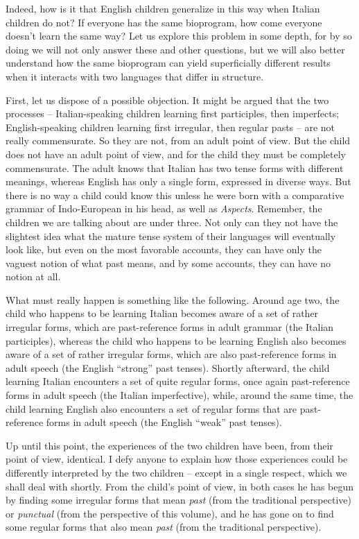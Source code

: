 Indeed, how is it that English children generalize in this way when Italian children do not? If everyone has the same bioprogram, how come everyone doesn't learn the same way? Let us explore this problem in some depth, for by so doing we will not only answer these and other questions, but we will also better understand how the same bioprogram can yield superficially different results when it interacts with two languages that differ in structure.

First, let us dispose of a possible objection. It might be argued that the two processes -- Italian-speaking children learning first parti\-ciples, then imperfects; English-speaking children learning first irregular, then regular pasts -- are not really commensurate. So they are not, from an adult point of view. But the child does not have an adult point of view, and for the child they must be completely commensurate. The adult knows that Italian has two tense forms with different meanings, whereas English has only a single form, expressed in diverse ways. But there is no way a child could know this unless he were born with a comparative grammar of Indo-European in his head, as well as \textit{Aspects}. Remember, the children we are talking about are under three. Not only can they not have the slightest idea what the mature tense system of their languages will eventually look like, but even on the most favorable accounts, they can have only the vaguest notion of what past means, and by some accounts, they can have no notion at all.


What must really happen is something like the following. Around age two, the child who happens to be learning Italian becomes aware of a set of rather irregular forms, which are past-reference forms in adult grammar (the Italian participles), whereas the child who happens to be learning English also becomes aware of a set of rather irregular forms, which are also past-reference forms in adult speech (the English ``strong'' past tenses). Shortly afterward, the child learning Italian encounters a set of quite regular forms, once again past-reference forms in adult speech (the Italian imperfective), while, around the same time, the child learning English also encounters a set of regular forms that are past-reference forms in adult speech (the English ``weak'' past tenses).

Up until this point, the experiences of the two children have been, from their point of view, identical. I defy anyone to explain how those experiences could be differently interpreted by the two children -- except in a single respect, which we shall deal with shortly. From the child's point of view, in both cases he has begun by finding some irregular forms that mean {\itshape past} (from the traditional perspective) or {\itshape punctual} (from the perspective of this volume), and he has gone on to find some regular forms that also mean {\itshape past} (from the traditional perspective).

